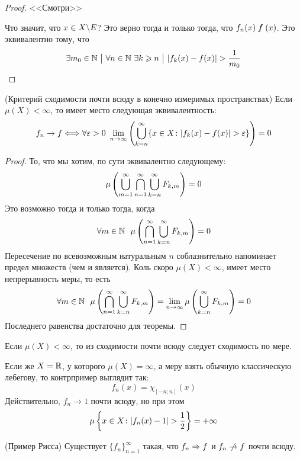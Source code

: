 \begin{proof}
	<<Смотри>>
	
	Что значит, что $x \in X \backslash E$? Это верно тогда и только тогда, что $f_n(x) \centernot f(x)$. Это эквивалентно тому, что
	\[
		\exists m_0 \in \N \such \forall n \in \N\ \exists k \ge n \such |f_k(x) - f(x)| > \frac{1}{m_0}
	\]
\end{proof}

\begin{theorem} (Критерий сходимости почти всюду в конечно измеримых пространствах)
	Если $\mu(X) < \infty$, то имеет место следующая эквивалентность:
	\[
		f_n \to f \Longleftrightarrow \forall \eps >0\ \lim_{n \to \infty} \ps{\bigcup_{k = n}^\infty \{x \in X \colon |f_k(x) - f(x)| > \eps\}} = 0
	\]
\end{theorem}

\begin{proof}
	То, что мы хотим, по сути эквивалентно следующему:
	\[
		\mu\left(\bigcup_{m = 1}^\infty \bigcap_{n = 1}^\infty \bigcup_{k = n}^\infty F_{k, m}\right) = 0
	\]
	Это возможно тогда и только тогда, когда
	\[
		\forall m \in \mathbb{N}\ \ \mu\left(\bigcap_{n = 1}^\infty \bigcup_{k = n}^\infty F_{k, m}\right) = 0
	\]
	Пересечение по всевозможным натуральным $n$ соблазнительно напоминает предел множеств (чем и является). Коль скоро $\mu(X) < \infty$, имеет место непрерывность меры, то есть
	\[
		\forall m \in \mathbb{N}\ \ \mu\left(\bigcap_{n = 1}^\infty \bigcup_{k = n}^\infty F_{k, m}\right) = \lim_{n \to \infty} \mu\left(\bigcup_{k = n}^\infty F_{k, m}\right) = 0
	\]
	Последнего равенства достаточно для теоремы.
\end{proof}

\begin{corollary}
	Если $\mu(X) < \infty$, то из сходимости почти всюду следует сходимость по мере.
\end{corollary}

\begin{note}
	Если же $X = \mathbb{R}$, у которого $\mu(X) = \infty$, а меру взять обычную классическую лебегову, то контрпример выглядит так:
	\[
		f_n(x) = \chi_{[-n; n]}(x)
	\]
	Действительно, $f_n \to 1$ почти всюду, но при этом
	\[
		\mu\left\{x \in X \colon |f_n(x) - 1| > \frac{1}{2}\right\} = +\infty
	\]
\end{note}

\begin{theorem} (Пример Рисса)
	Существует $\{f_n\}_{n = 1}^\infty$ такая, что $f_n \Rightarrow f$ и $f_n \centernot\to f$ почти всюду.
\end{theorem}

